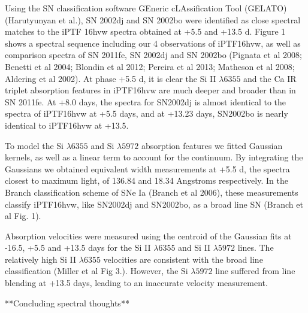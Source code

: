 \documentclass[twoside,twocolumn]{article}
\begin{document}
Using the SN classification software GEneric cLAssification Tool (GELATO) (Harutyunyan et al.), SN 2002dj and SN 2002bo were identified as close spectral matches to the iPTF 16hvw spectra obtained at +5.5 and +13.5 d. Figure 1 shows a spectral sequence including our 4 observations of iPTF16hvw, as well as comparison spectra of SN 2011fe, SN 2002dj and SN 2002bo (Pignata et al 2008; Benetti et al 2004; Blondin et al 2012; Pereira et al 2013; Matheson et al 2008; Aldering et al 2002). At phase +5.5 d, it is clear the Si II $\lambda 6355$ and the Ca IR triplet absorption features in iPTF16hvw are much deeper and broader than in SN 2011fe. At +8.0 days, the spectra for SN2002dj is almost identical to the spectra of iPTF16hvw at +5.5 days, and at +13.23 days, SN2002bo is nearly identical to iPTF16hvw at +13.5. 

To model the Si $\lambda 6355 $ and Si $\lambda 5972$ absorption features we fitted Gaussian kernels, as well as a linear term to account for the continuum. By integrating the Gaussians we obtained equivalent width measurements at +5.5 d, the spectra closest to maximum light, of 136.84 and 18.34 Angstroms respectively. In the Branch classification scheme of SNe Ia (Branch et al 2006), these measurements classify iPTF16hvw, like SN2002dj and SN2002bo, as a broad line SN (Branch et al Fig. 1).  

Absorption velocities were measured using the centroid of the Gaussian fits at -16.5, +5.5 and +13.5 days for the Si II $\lambda 6355 $ and Si II $\lambda 5972$ lines. The relatively high Si II $\lambda 6355 $ velocities are consistent with the broad line classification (Miller et al Fig 3.). However, the Si $\lambda 5972$ line suffered from line blending at +13.5 days, leading to an inaccurate velocity measurement.

**Concluding spectral thoughts**





\end{document}
